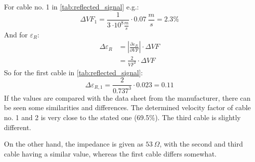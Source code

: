         For cable no. 1 in \cref{tab:reflected_signal} e.g.:
        \begin{equation*}
            \Delta VF_1=\frac{1}{\SI{3}{\cdot 10^8 \frac{m}{s}}}\cdot \SI{0.07}{\frac{m}{s}}=2.3\%
        \end{equation*}
        And for $ \varepsilon_R $:
        \begin{align}
            \Delta \varepsilon_R&=\left|\frac{\partial \varepsilon_R}{\partial VF}\right|\cdot \Delta VF\\
            &=\frac{2}{VF^3}\cdot \Delta VF
        \end{align}
        So for the first cable in \cref{tab:reflected_signal}:
        \begin{equation*}
            \Delta \varepsilon_{R,1}=\frac{2}{0.737^3}\cdot 0.023=0.11
        \end{equation*}
        If the values are compared with the data sheet from the manufacturer, there can be seen some similarities and differences.
        The determined velocity factor of cable no. 1 and 2 is very close to the stated one (69.5\%). The third cable is slightly
        different.\par
        On the other hand, the impedance is given as $ \SI{53}{\Omega} $, with the second and third cable having a similar value,
        whereas the first cable differs somewhat.
